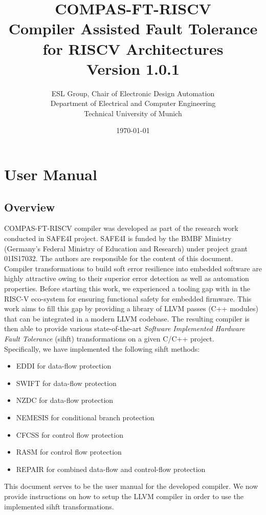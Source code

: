 \documentclass[12pt]{report}
\date{\today}
\title{
\textbf{COMPAS-FT-RISCV} \\
\large Compiler Assisted Fault Tolerance for RISCV Architectures \\
\small Version 1.0.1
}
\author{
ESL Group, Chair of Electronic Design Automation \\
Department of Electrical and Computer Engineering \\
Technical University of Munich
}
\begin{document}
\maketitle

\tableofcontents
\listoffigures

\newpage
\printacronyms

\chapter{User Manual}

\section{Overview}
COMPAS-FT-RISCV compiler was developed as part of the research work conducted in SAFE4I project. SAFE4I is funded by
the BMBF Ministry (Germany's Federal Ministry of Education and Research) under project grant 01IS17032. The authors
are responsible for the content of this document. \\

Compiler transformations to build soft error resilience into embedded software are highly attractive owing to their
superior error detection as well as automation properties. Before starting this work, we experienced a tooling
gap with in the RISC-V eco-system for ensuring functional safety for embedded firmware. This work aims to fill this gap
by providing a library of LLVM passes (C++ modules) that can be integrated in a modern LLVM codebase.
The resulting compiler is then able to provide various state-of-the-art
\textit{Software Implemented Hardware Fault Tolerance} (\ac{sihft}) transformations on a given C/C++ project. \\

Specifically, we have implemented the following \ac{sihft} methods:
\begin{itemize}
 \item{EDDI \cite{eddi} for data-flow protection}
 \item{SWIFT \cite{swift} for data-flow protection}
 \item{NZDC \cite{nzdc} for data-flow protection}
 \item{NEMESIS \cite{nemesis} for conditional branch protection}
 \item{CFCSS \cite{cfcss} for control flow protection}
 \item{RASM \cite{rasm} for control flow protection}
 \item{REPAIR \cite{repair} for combined data-flow and control-flow protection}
\end{itemize}

This document serves to be the user manual for the developed compiler. We now provide instructions on how to setup the
LLVM compiler in order to use the implemented \ac{sihft} transformations.

\newpage


\newpage




\end{document}
